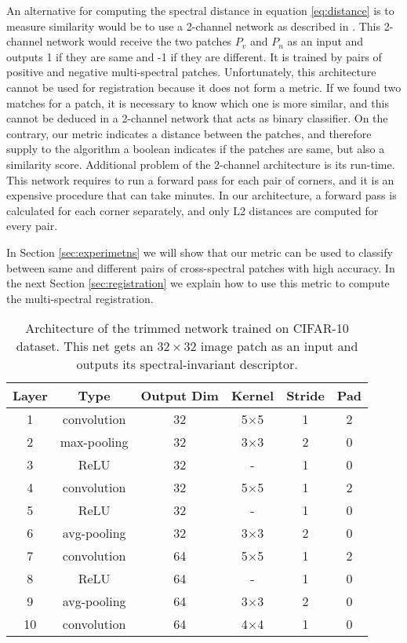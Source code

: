 \documentclass[10pt,twocolumn,letterpaper]{article}
\begin{document}
An alternative for computing the spectral distance in equation \eqref{eq:distance} is to measure similarity would be to use a 2-channel network as described in \cite{aguilera2016learning}. This 2-channel network would receive the two patches $P_v$ and $P_n$ as an input and outputs 1 if they are same and -1 if they are different. It is trained by pairs of positive and negative multi-spectral patches. Unfortunately, this architecture cannot be used for registration because it does not form a metric. If we found two matches for a patch, it is necessary to know which one is more similar, and this cannot be deduced in a 2-channel network that acts as binary classifier. On the contrary, our metric indicates a distance between the patches, and therefore supply to the algorithm a boolean indicates if the patches are same, but also a similarity score. Additional problem of the 2-channel architecture is its run-time. This network requires to run a forward pass for each pair of corners, and it is an expensive procedure that can take minutes. In our architecture, a forward pass is calculated for each corner separately, and only L2 distances are computed for every pair. 

In Section \ref{sec:experimetns} we will show that our metric can be used to classify between same and different pairs of cross-spectral patches with high accuracy. In the next Section \ref{sec:registration} we explain how to use this metric to compute the multi-spectral registration.

\begin{table}
	\centering
	\begin{tabular}{ c | c | c | c | c | c}
		Layer & Type & Output Dim & Kernel & Stride & Pad\\
		\hline
		1 & convolution & 32 & 5$\times$5 & 1 & 2\\
		2 & max-pooling & 32 & 3$\times$3 & 2 & 0\\
		3 & ReLU & 32 & - & 1 & 0 \\
		4 & convolution & 32 & 5$\times$5 & 1 & 2\\
		5 & ReLU & 32 & - & 1 & 0\\
		6 & avg-pooling & 32 & 3$\times$3 & 2 & 0\\
		7 & convolution & 64 & 5$\times$5 & 1 & 2\\
		8 & ReLU & 64 & - & 1 & 0\\
		9 & avg-pooling & 64 & 3$\times$3 & 2 & 0\\
		10 & convolution & 64 & 4$\times$4 & 1 & 0
	\end{tabular}
	\caption{Architecture of the trimmed network trained on CIFAR-10 dataset. This net gets an $32\times 32$ image patch as an input and outputs its spectral-invariant descriptor.}
	\label{table:1}
\end{table}
\end{document}
